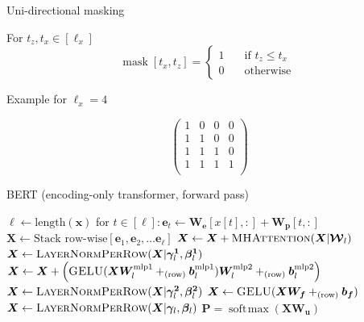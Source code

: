 \documentclass[12pt,aspectratio=169,handout]{beamer}
\DeclareMathOperator*{\softmax}{soft\!\max}
\DeclareMathOperator*{\mask}{mask}
\begin{document}
\begin{frame}{Uni-directional masking}

For $t_z, t_x \in [\ell_x]$
$$
\mask[t_x, t_z] =
 \begin{cases}
	1       & \quad \text{if } t_z \leq t_x \\
	0  & \quad \text{otherwise }
\end{cases}
$$

Example for $\ell_x = 4$

$$
\begin{pmatrix}
1 & 0 & 0 & 0 \\
1 & 1 & 0 & 0 \\
1 & 1 & 1 & 0 \\
1 & 1 & 1 & 1 \\
\end{pmatrix}
$$

\end{frame}


\begin{frame}{BERT (encoding-only transformer, forward pass)}
	
	\vspace{-2em}
	\begin{minipage}[t][10cm][t]{15cm}
		\begin{algorithmic}[1]
			\State $\ell \gets \text{length}(\bm{x})$
			\State for $t \in [\ell]: \bm{e}_t \gets \bm{W_e}[x[t],:] + \bm{W_p}[t,:]$
			\State $\bm{X} \gets \text{Stack row-wise}[\bm{e}_1, \bm{e}_2, \ldots \bm{e}_{\ell}]$
			\State $\bm{X} \gets \bm{X} + \textsc{MHAttention}(\bm{X} | \bm{\mathcal{W}}_l)$
			\State $\bm{X} \gets \textsc{LayerNormPerRow}(\bm{X} | \bm{\gamma^1}_l, \bm{\beta^1}_l)$
			\State $\bm{X} \gets \bm{X} + \left(
			\textsc{GELU}(\bm{X} \bm{W}^\text{mlp1}_l +_{\text{(row)}} \bm{b}^\text{mlp1}_l )
			\bm{W}^{\text{mlp2}}_l +_{\text{(row)}} \bm{b}^{\text{mlp2}}_l \right)$
			\State $\bm{X} \gets \textsc{LayerNormPerRow}(\bm{X} | \bm{\gamma^2}_l, \bm{\beta^2}_l)$
			\EndFor
			\State $\bm{X} \gets \textsc{GELU}(\bm{X} \bm{W_f}  +_{\text{(row)}} \bm{b_f} )$
			\State $\bm{X} \gets \textsc{LayerNormPerRow}(\bm{X} | \bm{\gamma}_l, \bm{\beta}_l)$
			\State \Return $\bm{P} = \softmax(\bm{X} \bm{W_u}) $
			\EndFunction
		\end{algorithmic}
		
	\end{minipage}
\end{frame}
\end{document}
